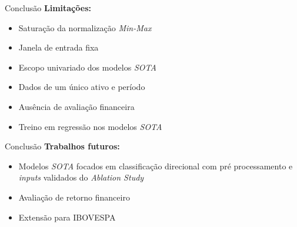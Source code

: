 \documentclass[10pt]{beamer}
\begin{document}
\begin{frame}{Conclusão}
\textbf{Limitações:}
\begin{itemize}
    \item Saturação da normalização \textit{Min-Max}
    \item Janela de entrada fixa
    \item Escopo univariado dos modelos \textit{SOTA}
    \item Dados de um único ativo e período
    \item Ausência de avaliação financeira
    \item Treino em regressão nos modelos \textit{SOTA}
\end{itemize}
\end{frame}

\begin{frame}{Conclusão}
\textbf{Trabalhos futuros:}
\begin{itemize}
    \item Modelos \textit{SOTA} focados em classificação direcional com pré processamento e \textit{inputs} validados do \textit{Ablation Study}
    \item Avaliação de retorno financeiro
    \item Extensão para IBOVESPA
\end{itemize}
\end{frame}

\end{document}
